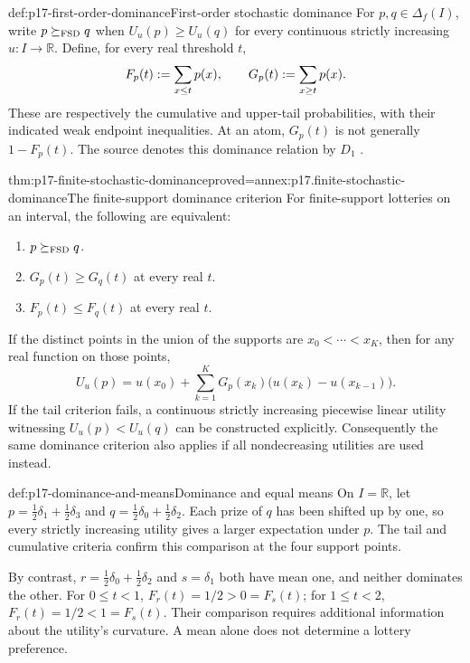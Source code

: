 \begin{hbdefinition}{def:p17-first-order-dominance}{First-order stochastic dominance}
For \(p,q\in\Delta_f(I)\), write \(p\succeq_{\rm FSD}q\) when
\(U_u(p)\geq U_u(q)\) for every continuous strictly increasing
\(u:I\to\mathbb R\). Define, for every real threshold \(t\),
\[
        F_p(t)\mathrel{:=}\sum_{x\leq t}p(x),\qquad
        G_p(t)\mathrel{:=}\sum_{x\geq t}p(x).
\]
These are respectively the cumulative and upper-tail probabilities,
with their indicated weak endpoint inequalities. At an atom,
\(G_p(t)\) is not generally \(1-F_p(t)\).
The source denotes this dominance relation by \(D_1\)
\cite[pp.~109--110]{Rubinstein2015LectureNotes}.
\end{hbdefinition}

\begin{hbtheorem}{thm:p17-finite-stochastic-dominance}{proved=annex:p17.finite-stochastic-dominance}{The finite-support dominance criterion}
For finite-support lotteries on an interval, the following are equivalent:
\begin{enumerate}
\item \(p\succeq_{\rm FSD}q\).
\item \(G_p(t)\geq G_q(t)\) at every real \(t\).
\item \(F_p(t)\leq F_q(t)\) at every real \(t\).
\end{enumerate}
If the distinct points in the union of the supports are
\(x_0<\cdots<x_K\), then for any real function on those points,
\[
 U_u(p)=u(x_0)+\sum_{k=1}^K
              G_p(x_k)\bigl(u(x_k)-u(x_{k-1})\bigr).
\]
If the tail criterion fails, a continuous strictly increasing piecewise
linear utility witnessing \(U_u(p)<U_u(q)\) can be constructed explicitly.
Consequently the same dominance criterion also applies if all
nondecreasing utilities are used instead.
\end{hbtheorem}

\begin{hbexample}{def:p17-dominance-and-means}{Dominance and equal means}
On \(I=\mathbb R\), let \(p=\tfrac12\delta_1+\tfrac12\delta_3\) and
\(q=\tfrac12\delta_0+\tfrac12\delta_2\). Each prize of \(q\) has
been shifted up by one, so every strictly increasing utility gives a larger
expectation under \(p\). The tail and cumulative criteria confirm this
comparison at the four support points.

By contrast, \(r=\tfrac12\delta_0+\tfrac12\delta_2\) and
\(s=\delta_1\) both have mean one, and neither dominates the other.
For \(0\leq t<1\), \(F_r(t)=1/2>0=F_s(t)\); for
\(1\leq t<2\), \(F_r(t)=1/2<1=F_s(t)\). Their comparison requires
additional information about the utility's curvature. A mean alone
does not determine a lottery preference.
\end{hbexample}

